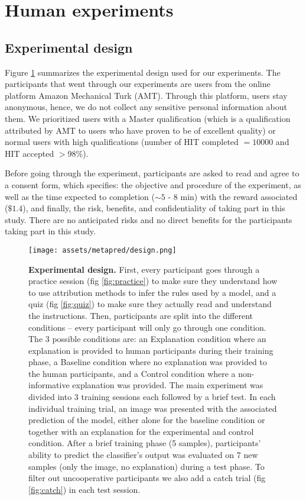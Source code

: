 
\section{Human experiments}
\label{ap:protocole}
\subsection{Experimental design}
Figure \ref{fig:design} summarizes the experimental design used for our experiments. The participants that went through our experiments are users from the online platform Amazon Mechanical Turk (AMT). Through this platform, users stay anonymous, hence, we do not collect any sensitive personal information about them. We prioritized users with a Master qualification (which is a qualification attributed by AMT to users who have proven to be of excellent quality) or normal users with high qualifications (number of HIT completed $=10 000$ and HIT accepted $> 98 \%$). 

Before going through the experiment, participants are asked to read and agree to a consent form, which specifies: the objective and procedure of the experiment, as well as the time expected to completion ($\sim 5$ - $8$ min) with the reward associated ($\$1.4$), and finally, the risk, benefits, and confidentiality of taking part in this study. 
There are no anticipated risks and no direct benefits for the participants taking part in this study.


\begin{figure*}[ht]
    \centering
    \texttt{[image: assets/metapred/design.png]}
    \caption{\textbf{Experimental design.} 
    First, every participant goes through a practice session (fig \ref{fig:practice}) to make sure they understand how to use attribution methods to infer the rules used by a model, and a quiz (fig \ref{fig:quiz}) to make sure they actually read and understand the instructions. Then, participants are split into the different conditions -- every participant will only go through one condition. The 3 possible conditions are: an Explanation condition where an explanation is provided to human participants during their training phase, a Baseline condition where no explanation was provided to the human participants, and a Control condition where a non-informative explanation was provided.
    The main experiment was divided into 3 training sessions each followed by a brief test. In each individual training trial, an image was presented with the associated prediction of the model, either alone for the baseline condition or together with an explanation for the experimental and control condition. After a brief training phase (5 samples), participants' ability to predict the classifier's output was evaluated on 7 new samples (only the image, no explanation) during a test phase. To filter out uncooperative participants we also add a catch trial (fig \ref{fig:catch}) in each test session.}
    \label{fig:design}
\end{figure*}


